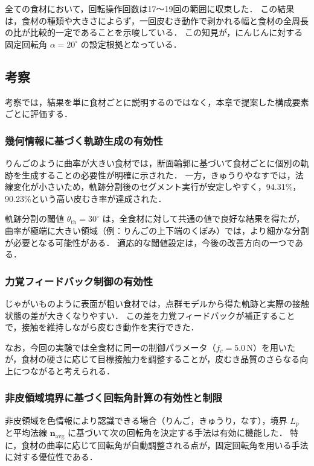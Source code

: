 全ての食材において，回転操作回数は17〜19回の範囲に収束した．
この結果は，食材の種類や大きさによらず，一回皮むき動作で剥かれる幅と食材の全周長の比が比較的一定であることを示唆している．
この知見が，にんじんに対する固定回転角 $\alpha = 20^\circ$ の設定根拠となっている．

\subsection{考察}

考察では，結果を単に食材ごとに説明するのではなく，本章で提案した構成要素ごとに評価する．

\subsubsection{幾何情報に基づく軌跡生成の有効性}

りんごのように曲率が大きい食材では，断面輪郭に基づいて食材ごとに個別の軌跡を生成することの必要性が明確に示された．
一方，きゅうりやなすでは，法線変化が小さいため，軌跡分割後のセグメント実行が安定しやすく，94.31\%，90.23\%という高い皮むき率が達成された．

軌跡分割の閾値 $\theta_{\mathrm{th}} = 30^\circ$ は，全食材に対して共通の値で良好な結果を得たが，曲率が極端に大きい領域（例：りんごの上下端のくぼみ）では，より細かな分割が必要となる可能性がある．
適応的な閾値設定は，今後の改善方向の一つである．

\subsubsection{力覚フィードバック制御の有効性}

じゃがいものように表面が粗い食材では，点群モデルから得た軌跡と実際の接触状態の差が大きくなりやすい．
この差を力覚フィードバックが補正することで，接触を維持しながら皮むき動作を実行できた．

なお，今回の実験では全食材に同一の制御パラメータ（$f_c = 5.0$\,N）を用いたが，食材の硬さに応じて目標接触力を調整することが，皮むき品質のさらなる向上につながると考えられる．

\subsubsection{非皮領域境界に基づく回転角計算の有効性と制限}

非皮領域を色情報により認識できる場合（りんご，きゅうり，なす），境界 $L_p$ と平均法線 $\mathbf{n}_{\mathrm{avg}}$ に基づいて次の回転角を決定する手法は有効に機能した．
特に，食材の曲率に応じて回転角が自動調整される点が，固定回転角を用いる手法に対する優位性である．

